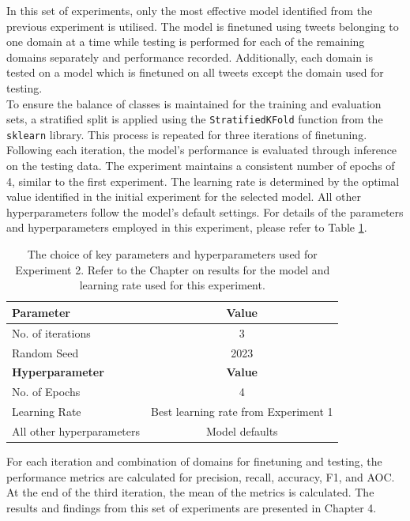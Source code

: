 In this set of experiments, only the most effective model identified from the previous experiment is utilised. The model is finetuned using tweets belonging to one domain at a time while testing is performed for each of the remaining domains separately and performance recorded. Additionally, each domain is tested on a  model which is finetuned on all tweets except the domain used for testing.\\

To ensure the balance of classes is maintained for the training and evaluation sets, a stratified split is applied using the \texttt{StratifiedKFold} function from the \texttt{sklearn} library. This process is repeated for three iterations of finetuning. Following each iteration, the model's performance is evaluated through inference on the testing data. The experiment maintains a consistent number of epochs of 4, similar to the first experiment. The learning rate is determined by the optimal value identified in the initial experiment for the selected model. All other hyperparameters follow the model's default settings. For details of the parameters and hyperparameters employed in this experiment, please refer to Table \ref{tab: exp2_params}.

\begin{table}[ht]
    \captionsetup{font=small}
    \small
    \centering
    \begin{tabularx}{\textwidth}{|X|c|}
        \hline
        \rowcolor[gray]{0.7}
        \textbf{Parameter}        & \textbf{Value}                       \\
        \hline
        No. of iterations         & 3                                    \\
        \rowcolor[gray]{0.9}
        Random Seed               & 2023                                 \\
        \hline
        \hline
        \rowcolor[gray]{0.7}
        \textbf{Hyperparameter}   & \textbf{Value}                       \\
        \hline
        No. of Epochs             & 4                                    \\
        \rowcolor[gray]{0.9}
        Learning Rate             & Best learning rate from Experiment 1 \\
        All other hyperparameters & Model defaults                       \\
        \hline
    \end{tabularx}
    \caption{The choice of key parameters and hyperparameters used for Experiment 2. Refer to the Chapter on results for the model and learning rate used for this experiment. }
    \label{tab: exp2_params}
\end{table}
For each iteration and combination of domains for finetuning and testing, the performance metrics are calculated for precision, recall, accuracy, F1, and AOC. At the end of the third iteration, the mean of the metrics is calculated. The results and findings from this set of experiments are presented in Chapter 4.

